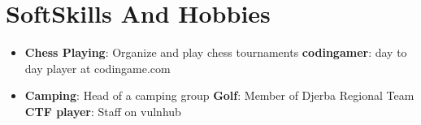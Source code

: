 \documentclass[letterpaper,11pt]{article}
\newcommand{\resumeSubHeadingListStart}{\begin{itemize}[leftmargin=*]}
\newcommand{\resumeSubHeadingListEnd}{\end{itemize}}
\begin{document}
\section{SoftSkills And Hobbies}
  \resumeSubHeadingListStart
\item{
     \textbf{Chess Playing}{: Organize and play chess tournaments}
     \hfill
     \textbf{codingamer}{: day to day player at codingame.com}
    }
    \item{
     \textbf{Camping}{: Head of a camping group}
     \textbf{Golf}{: Member of Djerba Regional Team}
     \textbf{CTF player}{: Staff on vulnhub}
    }
  \resumeSubHeadingListEnd

\end{document}
